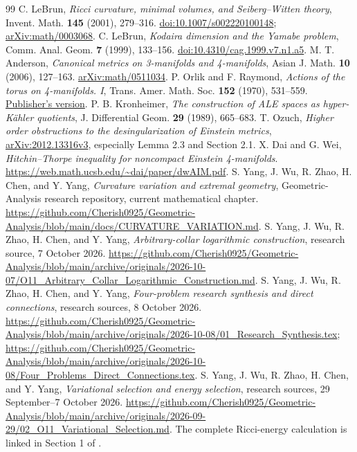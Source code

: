 \documentclass[11pt,a4paper]{article}
\theoremstyle{definition}\newtheorem{definition}[theorem]{Definition}
\theoremstyle{remark}\newtheorem{remark}[theorem]{Remark}
\begin{document}
\begin{thebibliography}{99}
C. LeBrun, \emph{Ricci curvature, minimal volumes, and Seiberg--Witten theory}, Invent. Math. \textbf{145} (2001), 279--316. \href{https://doi.org/10.1007/s002220100148}{doi:10.1007/s002220100148}; \href{https://arxiv.org/abs/math/0003068}{arXiv:math/0003068}.
C. LeBrun, \emph{Kodaira dimension and the Yamabe problem}, Comm. Anal. Geom. \textbf{7} (1999), 133--156. \href{https://doi.org/10.4310/cag.1999.v7.n1.a5}{doi:10.4310/cag.1999.v7.n1.a5}.
M. T. Anderson, \emph{Canonical metrics on 3-manifolds and 4-manifolds}, Asian J. Math. \textbf{10} (2006), 127--163. \href{https://arxiv.org/abs/math/0511034}{arXiv:math/0511034}.
P. Orlik and F. Raymond, \emph{Actions of the torus on 4-manifolds. I}, Trans. Amer. Math. Soc. \textbf{152} (1970), 531--559. \href{https://www.ams.org/tran/1970-152-02/S0002-9947-1970-0268911-3/}{Publisher's version}.
P. B. Kronheimer, \emph{The construction of ALE spaces as hyper-Kähler quotients}, J. Differential Geom. \textbf{29} (1989), 665--683.
T. Ozuch, \emph{Higher order obstructions to the desingularization of Einstein metrics}, \href{https://arxiv.org/abs/2012.13316v3}{arXiv:2012.13316v3}, especially Lemma 2.3 and Section 2.1.
X. Dai and G. Wei, \emph{Hitchin--Thorpe inequality for noncompact Einstein 4-manifolds}. \url{https://web.math.ucsb.edu/~dai/paper/dwAIM.pdf}.
S. Yang, J. Wu, R. Zhao, H. Chen, and Y. Yang, \emph{Curvature variation and extremal geometry}, Geometric-Analysis research repository, current mathematical chapter. \url{https://github.com/Cherish0925/Geometric-Analysis/blob/main/docs/CURVATURE_VARIATION.md}.
S. Yang, J. Wu, R. Zhao, H. Chen, and Y. Yang, \emph{Arbitrary-collar logarithmic construction}, research source, 7 October 2026. \url{https://github.com/Cherish0925/Geometric-Analysis/blob/main/archive/originals/2026-10-07/O11_Arbitrary_Collar_Logarithmic_Construction.md}.
S. Yang, J. Wu, R. Zhao, H. Chen, and Y. Yang, \emph{Four-problem research synthesis and direct connections}, research sources, 8 October 2026. \url{https://github.com/Cherish0925/Geometric-Analysis/blob/main/archive/originals/2026-10-08/01_Research_Synthesis.tex}; \url{https://github.com/Cherish0925/Geometric-Analysis/blob/main/archive/originals/2026-10-08/Four_Problems_Direct_Connections.tex}.
S. Yang, J. Wu, R. Zhao, H. Chen, and Y. Yang, \emph{Variational selection and energy selection}, research sources, 29 September--7 October 2026. \url{https://github.com/Cherish0925/Geometric-Analysis/blob/main/archive/originals/2026-09-29/02_O11_Variational_Selection.md}. The complete Ricci-energy calculation is linked in Section 1 of \cite{RepoVariation}.

\end{thebibliography}
\end{document}
